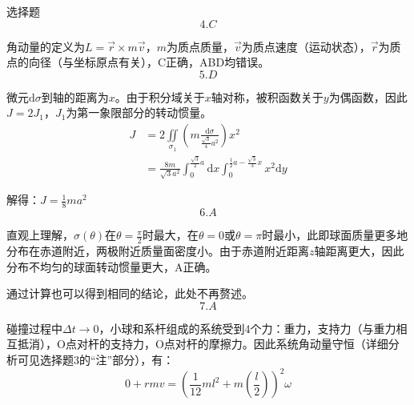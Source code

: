 \documentclass[a4paper,fleqn,twocolumn]{ctexart}
\newcommand{\di}[1]{\mathrm{d}#1}
\newcommand{\zbj}[4]
{
\draw (0,0) node[below left] {$ O $};
\draw [->] (#1,0) -- (#2,0) node[right] {$ x $};
\draw [->] (0,#3) -- (0,#4) node[right] {$ y $};
}
\begin{document}
\begin{section}{选择题}
		\[4.C\]\par
		角动量的定义为$ L=\vec{r}\times m\vec{v} $，$ m $为质点质量，$ \vec{v} $为质点速度（运动状态），$ \vec{r} $为质点的向径（与坐标原点有关），C正确，ABD均错误。
		\[5.D\]\par
		\par
		微元$ \di{\sigma} $到轴的距离为$ x $。由于积分域关于$ x $轴对称，被积函数关于$ y $为偶函数，因此$ J=2J_1 $，$ J_1 $为第一象限部分的转动惯量。
		\begin{align*}
			J&=2\iint\limits_{\sigma_1}\left(m\frac{\di{\sigma}}{\frac{\sqrt{3}}{4}a^2}\right)x^2\\
			&=\frac{8m}{\sqrt{3}a^2}\int_0^{\frac{\sqrt{3}}{2}a}\di{x}\int_0^{\frac{1}{2}a-\frac{\sqrt{3}}{3}x}x^2\di{y}
		\end{align*}\par
		解得：$ J=\frac{1}{8}ma^2 $
		\[6.A\]\par
		直观上理解，$ \sigma(\theta) $在$ \theta=\frac{\pi}{2} $时最大，在$ \theta=0 $或$ \theta=\pi $时最小，此即球面质量更多地分布在赤道附近，两极附近质量面密度小。由于赤道附近距离$ z $轴距离更大，因此分布不均匀的球面转动惯量更大，A正确。\par
		通过计算也可以得到相同的结论，此处不再赘述。
		\[7.A\]\par
		碰撞过程中$ \Delta t\to 0 $，小球和系杆组成的系统受到4个力：重力，支持力（与重力相互抵消），O点对杆的支持力，O点对杆的摩擦力。因此系统角动量守恒（详细分析可见选择题3的“注”部分），有：
		\[0+rmv=(\frac{1}{12}ml^2+m\left(\frac{l}{2}\right))^2\omega\]

\end{section}
\end{document}
